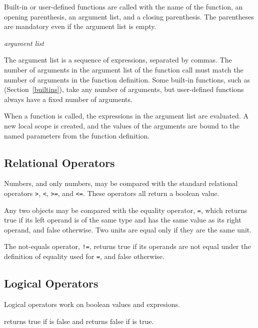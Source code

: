 Built-in or user-defined functions are called with the name of the
function, an opening parenthesis, an argument list, and a closing
parenthesis.  The parentheses are mandatory even if the argument list
is empty.


\begin{syntax}
\id{}\key{(} \textit{argument list} \key{)}
\end{syntax}

The argument list is a sequence of expressions, separated by commas.
The number of arguments in the argument list of the function call must
match the number of arguments in the function definition.  Some
built-in functions, such as  (Section~\ref{builtins}),
take any number of arguments, but user-defined functions always have a
fixed number of arguments.

When a function is called, the expressions in the argument list are
evaluated.  A new local scope is created, and the values of the
arguments are bound to the named parameters from the function
definition.



\subsection{Relational Operators}

Numbers, and only numbers, may be compared with the standard
relational operators \verb|>|, \verb|<|, \verb|>=|, and \verb|<=|.
These operators all return a boolean value.

Any two objects may be compared with the equality operator, \verb|=|,
which returns true if its left operand is of the same type and has the
same value as its right operand, and false otherwise.  Two units are
equal only if they are the same unit.

The not-equals operator, \verb|!=|, returns true if its operands are
not equal under the definition of equality used for \verb|=|, and
false otherwise.



\subsection{Logical Operators}

Logical operators work on boolean values and expresions.

\begin{syntax}
 \expr{}
\end{syntax}
returns true if \expr{} is false and returns false if \expr{} is true.

